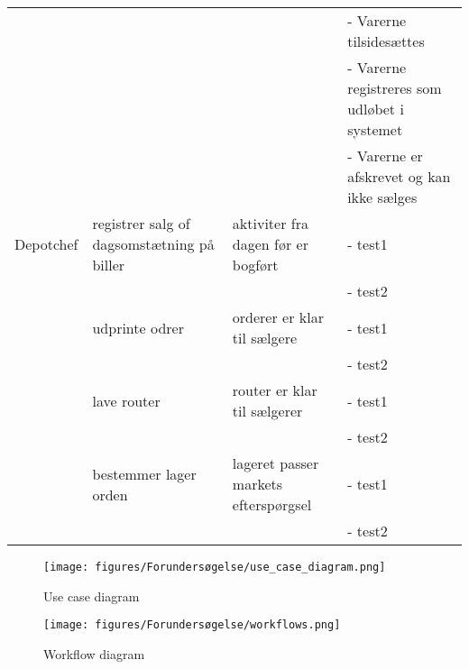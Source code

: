 \begin{center}
\begin{tabular}{ |p{90pt}|p{90pt}|p{90pt}|p{90pt}| }
    &&&
    - Varerne tilsidesættes \\
    &&&
    - Varerne registreres som udløbet i systemet \\
    &&&
    - Varerne er afskrevet og kan ikke sælges \\
    \hline
    Depotchef
    & registrer salg of dagsomstætning på biller & aktiviter fra dagen før er bogført &
    - test1 \\
    &&&
    - test2 \\
    \hline
    & udprinte odrer & orderer er klar til sælgere &
    - test1 \\
    &&&
    - test2 \\
    \hline
    & lave router & router er klar til sælgerer &
    - test1 \\
    &&&
    - test2 \\
    \hline
    & bestemmer lager orden & lageret passer markets efterspørgsel &
    - test1 \\
    &&&
    - test2 \\
    \hline
\end{tabular}
\end{center}

\begin{figure}[H]
    \centering
    \texttt{[image: figures/Forundersøgelse/use\_case\_diagram.png]}
    \caption{Use case diagram}
    \label{fig:use_case_diagram}
\end{figure}

\begin{figure}[H]
    \centering
    \texttt{[image: figures/Forundersøgelse/workflows.png]}
    \caption{Workflow diagram}
    \label{fig:workflows}
\end{figure}